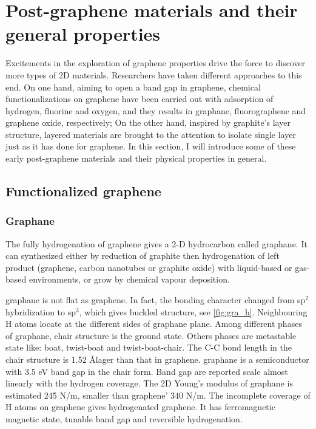 \section{Post-graphene materials and their general properties}

Excitements in the exploration of graphene properties drive the force to discover more types of 2D materials. Researchers have taken different approaches to this end. On one hand, aiming to open a band gap in graphene, chemical functionalizations on graphene have been carried out with adsorption of hydrogen, fluorine and oxygen, and they results in graphane, fluorographene and graphene oxide, respectively; On the other hand, inspired by graphite's layer structure, layered materials are brought to the attention to isolate single layer just as it has done for graphene. In this section, I will introduce some of these early post-graphene materials and their physical properties in general.

\subsection{Functionalized graphene}

\subsubsection{Graphane}

The fully hydrogenation of graphene gives a 2-D hydrocarbon called graphane. It can synthesized either by reduction of graphite then hydrogenation of left product (graphene, carbon nanotubes or graphite oxide) with liquid-based\cite{Yang2012} or gas-based\cite{Burgess2011} environments, or grow by chemical vapour deposition\cite{wang2010}. 

graphane is not flat as graphene. In fact, the bonding character changed from sp$^2$ hybridization to sp$^3$, which gives buckled structure, see \autoref{fig:gra_h}. Neighbouring H atoms locate at the different sides of graphane plane. Among different phases of graphane, chair structure is the ground state. Others phases are metastable state like: boat, twist-boat and twist-boat-chair\cite{Samarakoon2009}. The C-C bond length in the chair structure is 1.52 \AA lager than that in graphene. graphane is a semiconductor with 3.5 eV band gap in the chair form. Band gap are reported scale almost linearly with the hydrogen coverage\cite{Ilyin2011}. The 2D Young's modulus of graphane is estimated 245 \si{N/m}\cite{Munoz2010}, smaller than graphene' 340 \si{N/m}. The incomplete coverage of H atoms on graphene gives hydrogenated graphene. It has ferromagnetic magnetic state\cite{Zhou2009}, tunable band gap\cite{Shkrebtii2011} and reversible hydrogenation\cite{Elias2009}. 

